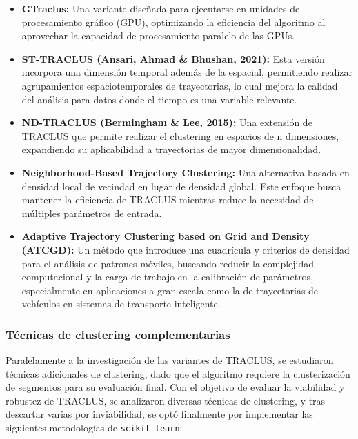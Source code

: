 \begin{itemize}
    \item \textbf{GTraclus:} Una variante diseñada para ejecutarse en unidades de procesamiento gráfico (GPU), optimizando la eficiencia del algoritmo al aprovechar la capacidad de procesamiento paralelo de las GPUs.

    \item \textbf{ST-TRACLUS (Ansari, Ahmad \& Bhushan, 2021):} Esta versión incorpora una dimensión temporal además de la espacial, permitiendo realizar agrupamientos espaciotemporales de trayectorias, lo cual mejora la calidad del análisis para datos donde el tiempo es una variable relevante.

    \item \textbf{ND-TRACLUS (Bermingham \& Lee, 2015):} Una extensión de TRACLUS que permite realizar el clustering en espacios de n dimensiones, expandiendo su aplicabilidad a trayectorias de mayor dimensionalidad.

    \item \textbf{Neighborhood-Based Trajectory Clustering:} Una alternativa basada en densidad local de vecindad en lugar de densidad global. Este enfoque busca mantener la eficiencia de TRACLUS mientras reduce la necesidad de múltiples parámetros de entrada.

    \item \textbf{Adaptive Trajectory Clustering based on Grid and Density (ATCGD):} Un método que introduce una cuadrícula y criterios de densidad para el análisis de patrones móviles, buscando reducir la complejidad computacional y la carga de trabajo en la calibración de parámetros, especialmente en aplicaciones a gran escala como la de trayectorias de vehículos en sistemas de transporte inteligente.
\end{itemize}

\subsubsection{Técnicas de clustering complementarias}

Paralelamente a la investigación de las variantes de TRACLUS, se estudiaron técnicas adicionales de clustering, dado que el algoritmo requiere la clusterización de segmentos para su evaluación final. Con el objetivo de evaluar la viabilidad y robustez de TRACLUS, se analizaron diversas técnicas de clustering, y tras descartar varias por inviabilidad, se optó finalmente por implementar las siguientes metodologías de \texttt{scikit-learn}:

